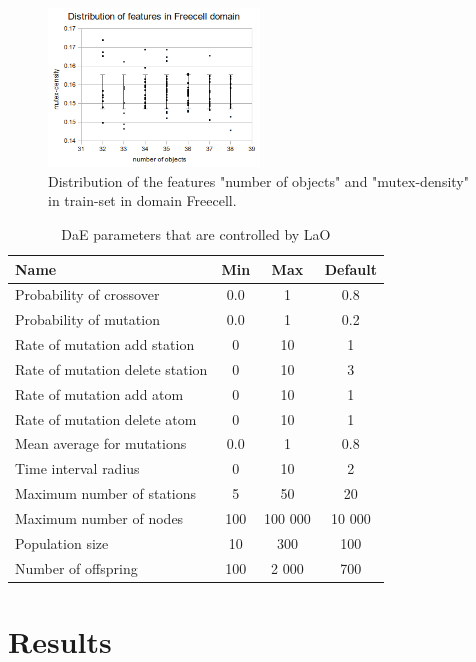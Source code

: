 \documentclass[letterpaper]{article}
\begin{document}
\begin{figure}[h!]
  \centering
    \includegraphics[width=0.5\textwidth]{results/freecell_train_objects_mutex-density.png}
  \caption{Distribution of the features "number of objects" and "mutex-density" in train-set in domain Freecell. }
\label{figure:featuresdistribution}
\end{figure}



\begin{table}[ht]
\centering
\begin{tabular}{l c c c}
\hline\hline
Name & Min & Max & Default \\ 
\hline
Probability of crossover & 0.0 & 1 & 0.8 \\
Probability of mutation & 0.0& 1& 0.2 \\
Rate of mutation add station& 0& 10& 1 \\
Rate of mutation delete station& 0& 10& 3 \\
Rate of mutation add atom& 0& 10& 1 \\
Rate of mutation delete atom& 0& 10& 1 \\
Mean average for mutations& 0.0& 1& 0.8 \\
Time interval radius& 0& 10& 2 \\
Maximum number of stations& 5& 50& 20 \\
Maximum number of nodes& 100& 100 000& 10 000 \\
Population size& 10& 300& 100 \\
Number of offspring & 100& 2 000& 700 \\
\hline
\end{tabular}
\caption{DaE parameters that are controlled by LaO}
\label{table:parameters}
\end{table} 

\section{Results}
\label{section:results}
\end{document}
